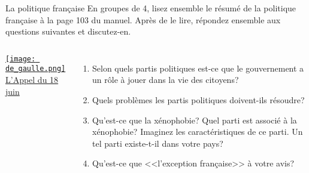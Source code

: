 \begin{frame}{La politique française}
  En groupes de 4, lisez ensemble le résumé de la politique française à la page 103 du manuel.
  Après de le lire, répondez ensemble aux questions suivantes et discutez-en.
  \begin{columns}
      \begin{center}
        \href{https://www.youtube.com/watch?v=_3iEBJO2AV0}{\texttt{[image: de\_gaulle.png]}} \\
        \href{https://www.youtube.com/watch?v=ung6UiY3YY4}{L'Appel du 18 juin}
      \end{center}
      \begin{enumerate}
        \item Selon quels partis politiques est-ce que le gouvernement a un rôle à jouer dans la vie des citoyens?
        \item Quels problèmes les partis politiques doivent-ils résoudre?
        \item Qu'est-ce que la xénophobie? Quel parti est associé à la xénophobie? Imaginez les caractéristiques de ce parti. Un tel parti existe-t-il dans votre pays?
        \item Qu'est-ce que <<l'exception française>> à votre avis?
      \end{enumerate}
  \end{columns}
\end{frame}